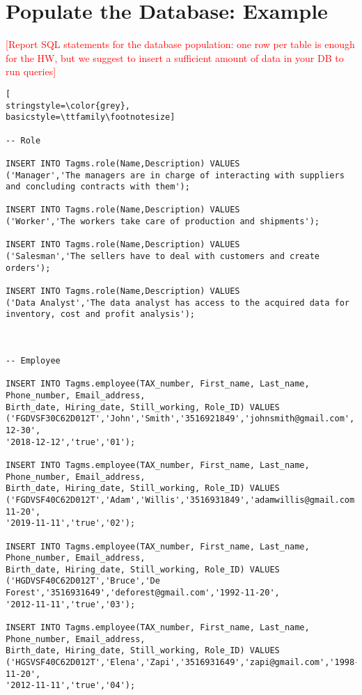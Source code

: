 
\section{Populate the Database: Example}
\textcolor{red}{[Report SQL statements for the database population: one row per table is enough for the HW, but we suggest to insert a sufficient amount of data in your DB to run queries]}


\begin{lstlisting}[
stringstyle=\color{grey},
basicstyle=\ttfamily\footnotesize]

-- Role

INSERT INTO Tagms.role(Name,Description) VALUES 
('Manager','The managers are in charge of interacting with suppliers and concluding contracts with them');

INSERT INTO Tagms.role(Name,Description) VALUES 
('Worker','The workers take care of production and shipments');

INSERT INTO Tagms.role(Name,Description) VALUES 
('Salesman','The sellers have to deal with customers and create orders');

INSERT INTO Tagms.role(Name,Description) VALUES 
('Data Analyst','The data analyst has access to the acquired data for inventory, cost and profit analysis');



-- Employee

INSERT INTO Tagms.employee(TAX_number, First_name, Last_name, Phone_number, Email_address,
Birth_date, Hiring_date, Still_working, Role_ID) VALUES
('FGDVSF30C62D012T','John','Smith','3516921849','johnsmith@gmail.com','1995-12-30',
'2018-12-12','true','01');

INSERT INTO Tagms.employee(TAX_number, First_name, Last_name, Phone_number, Email_address,
Birth_date, Hiring_date, Still_working, Role_ID) VALUES
('FGDVSF40C62D012T','Adam','Willis','3516931849','adamwillis@gmail.com','1993-11-20',
'2019-11-11','true','02');

INSERT INTO Tagms.employee(TAX_number, First_name, Last_name, Phone_number, Email_address,
Birth_date, Hiring_date, Still_working, Role_ID) VALUES
('HGDVSF40C62D012T','Bruce','De Forest','3516931649','deforest@gmail.com','1992-11-20',
'2012-11-11','true','03');

INSERT INTO Tagms.employee(TAX_number, First_name, Last_name, Phone_number, Email_address,
Birth_date, Hiring_date, Still_working, Role_ID) VALUES
('HGSVSF40C62D012T','Elena','Zapi','3516931649','zapi@gmail.com','1998-11-20',
'2012-11-11','true','04');




\end{lstlisting}
